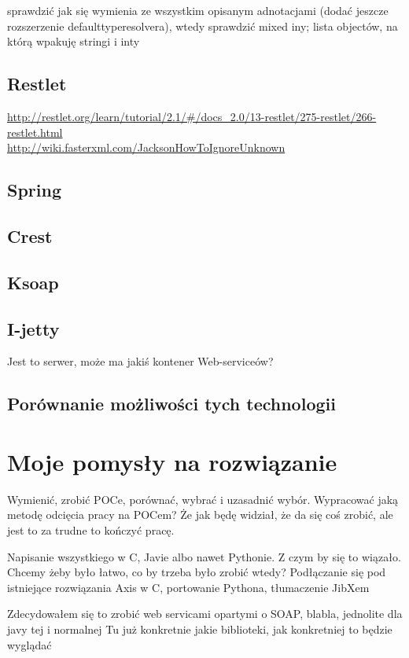 \documentclass[twoside,a4paper]{book}
\begin{document}
sprawdzić jak się wymienia ze wszystkim opisanym adnotacjami (dodać jeszcze rozszerzenie defaulttyperesolvera), wtedy sprawdzić mixed iny; lista objectów, na którą wpakuję stringi i inty

\subsection{Restlet}
\url{http://restlet.org/learn/tutorial/2.1/#/docs_2.0/13-restlet/275-restlet/266-restlet.html}\\
\url{http://wiki.fasterxml.com/JacksonHowToIgnoreUnknown}\\

\subsection{Spring}
\subsection{Crest}
\subsection{Ksoap}

\subsection{I-jetty}
Jest to serwer, może ma jakiś kontener Web-serviceów?

\subsection{Porównanie możliwości tych technologii}


\section{Moje pomysły na rozwiązanie}
Wymienić, zrobić POCe, porównać, wybrać i uzasadnić wybór. Wypracować jaką metodę odcięcia pracy na POCem? Że jak będę widział, że da się coś zrobić, ale jest to za trudne to kończyć pracę.

Napisanie wszystkiego w C, Javie albo nawet Pythonie. Z czym by się to wiązało. Chcemy żeby było łatwo, co by trzeba było zrobić wtedy?
Podłączanie się pod istniejące rozwiązania Axis w C, portowanie Pythona, tłumaczenie JibXem

Zdecydowałem się to zrobić web servicami opartymi o SOAP, blabla, jednolite dla javy tej i normalnej
Tu już konkretnie jakie biblioteki, jak konkretniej to będzie wyglądać
\end{document}

